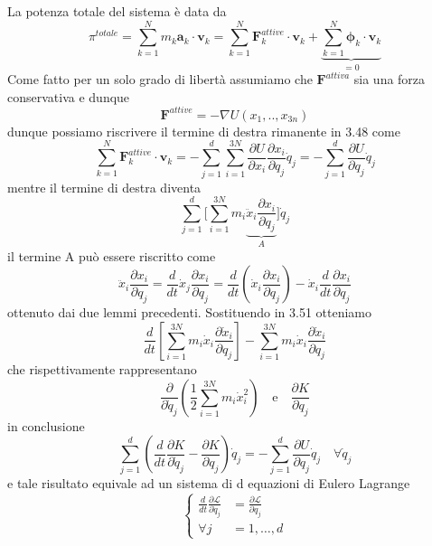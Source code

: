 La potenza totale del sistema \`{e} data da 
\begin{equation}
	\pi^{totale} = \sum_{k=1}^{N}m_k \bm{a}_k \cdot \bm{v}_{k} = \sum_{k=1}^{N} \bm{F}_{k}^{attive} \cdot \bm{v}_{k} + \underbrace{ \sum_{k=1}^{N} \bm{\phi}_{k} \cdot \bm{v}_k }_{=0}
\end{equation}
Come fatto per un solo grado di libert\`{a} assumiamo che $\bm{F}^{attiva}$ sia una forza conservativa e dunque 
\begin{equation}
\bm{F}^{attive}	= - \nabla U(x_1,..,x_{3n})
\end{equation}
 dunque possiamo riscrivere il termine di destra rimanente in 3.48 come 
 \begin{equation}
 	\sum_{k=1}^{N} \bm{F}_{k}^{attive} \cdot \bm{v}_{k} = 
-\sum_{j=1}^d \sum_{i=1}^{3 N} \frac{\partial U}{\partial x_i} \frac{\partial x_i}{\partial q_j} \dot{q}_j = 
-\sum_{j=1}^d \frac{\partial U}{\partial q_j} \dot{q}_j
\end{equation}
mentre il termine di destra diventa 
\begin{equation}
\sum_{j=1}^d \Big [\sum_{i=1}^{3 N} m_i \underbrace{\ddot{x}_i \frac{\partial x_i}{\partial q_j}}_{A}\Big ]\dot{q}_j
\end{equation}
il termine A pu\`{o} essere riscritto come
\begin{equation}
\ddot{x}_i \frac{\partial x_i}{\partial q_j}=\frac{d}{d t} \dot{x}_j \frac{\partial x_i}{\partial q_j}=\frac{d}{d t}\left(\dot{x}_i \frac{\partial x_i}{\partial q_j}\right)-\dot{x}_i \frac{d}{d t} \frac{\partial x_i}{\partial q_j}
\end{equation}
ottenuto dai due lemmi precedenti. Sostituendo in 3.51 otteniamo
\begin{equation}
\frac{d}{d t}\left[\sum_{i=1}^{3 N} m_i \dot{x}_i \frac{\partial \dot{x}_i}{\partial q_j}\right]-\sum_{i=1}^{3 N} m_i \dot{x}_i \frac{\partial\dot{x}_i}{\partial q_j} 
\end{equation}
che rispettivamente rappresentano
\begin{equation}
\frac{\partial}{\partial \dot{q}_j}\left(\frac{1}{2} \sum_{i=1}^{3 N} m_i \dot{x}_i^2\right) \quad \text{e} \quad 
\frac{\partial K}{\partial q_j} 
\end{equation}
in conclusione 
\begin{equation}
\sum_{j=1}^d\left(\frac{d}{d t} \frac{\partial K}{\partial \dot{q}_j}-\frac{\partial K}{\partial q_j}\right) \dot{q}_j=-\sum_{j=1}^d \frac{\partial U}{\partial q_j} \dot{q}_j \quad \forall \dot{q}_j
\end{equation}
e tale risultato equivale ad un sistema di d equazioni di Eulero Lagrange 
\begin{equation}
\left\{\begin{aligned}
\frac{d}{d t} \frac{\partial \mathcal{L}}{\partial \dot{q}_j} & =\frac{\partial \mathcal{L}}{\partial q_j} \\
\forall j & =1, \ldots, d
\end{aligned}\right.
\end{equation}

